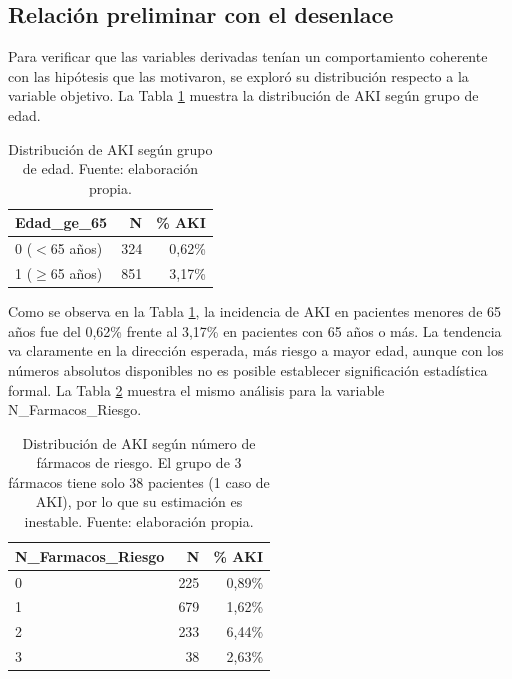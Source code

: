 \documentclass[12pt, a4paper, oneside]{report}
\begin{document}
\subsection{Relación preliminar con el desenlace}

Para verificar que las variables derivadas tenían un comportamiento coherente con las hipótesis que las motivaron, se exploró su distribución respecto a la variable objetivo. La Tabla \ref{tab:aki_edad} muestra la distribución de AKI según grupo de edad.

\begin{table}[h]
    \centering
    \begin{tabular}{lrr}
        \toprule
        \textbf{Edad\_ge\_65} & \textbf{N} & \textbf{\% AKI} \\
        \midrule
        0 ($<$65 años)    & 324 & 0,62\% \\
        1 ($\geq$65 años) & 851 & 3,17\% \\
        \bottomrule
    \end{tabular}
    \caption{Distribución de AKI según grupo de edad. Fuente: elaboración propia.}
    \label{tab:aki_edad}
\end{table}

Como se observa en la Tabla \ref{tab:aki_edad}, la incidencia de AKI en pacientes menores de 65 años fue del 0,62\% frente al 3,17\% en pacientes con 65 años o más. La tendencia va claramente en la dirección esperada, más riesgo a mayor edad, aunque con los números absolutos disponibles no es posible establecer significación estadística formal. La Tabla \ref{tab:aki_farmacos} muestra el mismo análisis para la variable N\_Farmacos\_Riesgo.

\begin{table}[h]
    \centering
    \begin{tabular}{lrr}
        \toprule
        \textbf{N\_Farmacos\_Riesgo} & \textbf{N} & \textbf{\% AKI} \\
        \midrule
        0 & 225 & 0,89\% \\
        1 & 679 & 1,62\% \\
        2 & 233 & 6,44\% \\
        3 & 38  & 2,63\% \\
        \bottomrule
    \end{tabular}
    \caption{Distribución de AKI según número de fármacos de riesgo. El grupo de 3 fármacos tiene solo 38 pacientes (1 caso de AKI), por lo que su estimación es inestable. Fuente: elaboración propia.}
    \label{tab:aki_farmacos}
\end{table}
\end{document}
